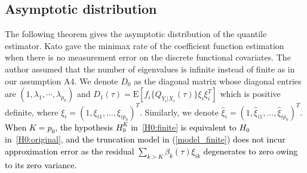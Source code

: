 \documentclass[times,sort&compress,3p]{elsarticle}
\theoremstyle{plain}%
\theoremstyle{definition}
\newcommand{\bD}{{D}}
\newcommand{\bxi}{{\xi}}
\newcommand{\ml}[1]{\textcolor{black}{{#1}}}
\begin{document}
\subsection{Asymptotic distribution} 
The following theorem gives the asymptotic distribution of the quantile estimator. Kato \cite{Kato:12} gave the minimax rate of the coefficient function estimation when there is no measurement error on the discrete functional covariates. The author assumed that the number of eigenvalues is infinite instead of finite as in our assumption A4. 
{} We denote $\bD_0$ as the diagonal matrix whose diagonal entries are $(1, \lambda_1, \cdots, \lambda_{p_0})$ and $\bD_1(\tau) = \text{E}[f_i\{Q_{Y_i|X_i}(\tau)\} \bxi_i \bxi_i^T]$ which is positive definite, where $\bxi_i =(1, \xi_{i1}, \ldots, \xi_{ip_0})^T$. Similarly, we denote $\widehat{\xi}_{i} =(1, \widehat{\xi}_{i1}, \ldots, \widehat{\xi}_{ip_0})^T$. {\ml{When $K = p_0$, the hypothesis $H_0^K$ in~\eqref{H0:finite} is equivalent to $H_0$ in~\eqref{H0:original}, and the truncation model in (\ref{model_finite}) does not incur approximation error as the residual $\sum_{k > K} \beta_k(\tau) \xi_{ik}$ degenerates to zero owing to its zero variance.}}
\end{document}
